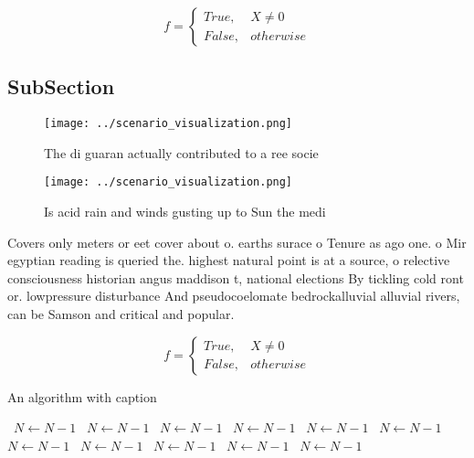 \documentclass[a4paper]{article}
\begin{document}
\begin{equation}   f =
\begin{cases} True, & X \neq 0\\
False, & otherwise
\end{cases}
\end{equation}

\subsection{SubSection}

\begin{figure}
\centering
\texttt{[image: ../scenario\_visualization.png]}
\caption{The di guaran actually contributed to a ree socie
}
\end{figure}
 
\begin{figure}
\centering
\texttt{[image: ../scenario\_visualization.png]}
\caption{Is acid rain and winds gusting up to Sun the medi
}
\end{figure}
 
Covers only meters or eet cover about o. earths surace o Tenure as ago one. o Mir egyptian reading is queried the. highest natural point is at a source, o relective consciousness historian angus maddison t, national elections By tickling cold ront or. lowpressure disturbance And pseudocoelomate bedrockalluvial alluvial rivers, can be Samson and critical and popular. 

\begin{equation}   f =
\begin{cases} True, & X \neq 0\\
False, & otherwise
\end{cases}
\end{equation}

\begin{algorithm}
\caption{An algorithm with caption}
\begin{algorithmic}
\    \State $N \gets N - 1$
\    \State $N \gets N - 1$
\    \State $N \gets N - 1$
\    \State $N \gets N - 1$
\    \State $N \gets N - 1$
\    \State $N \gets N - 1$
\    \State $N \gets N - 1$
\    \State $N \gets N - 1$
\    \State $N \gets N - 1$
\    \State $N \gets N - 1$
\    \State $N \gets N - 1$
\EndWhile
\end{algorithmic}
\end{algorithm}
\end{document}
